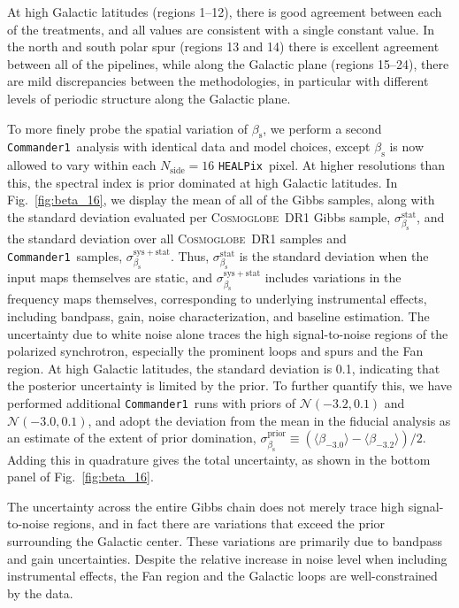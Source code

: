 \documentclass[twocolumn]{../../common/aa}
\def\healpix{\texttt{HEALPix}}
\def\commanderone{\texttt{Commander1}}
\newcommand{\cosmoglobe}{\textsc{Cosmoglobe}}
\begin{document}
At high Galactic latitudes (regions 1--12), there is good agreement between each of the treatments, and all values are consistent with a single constant value. 
In the north and south polar spur (regions 13 and 14) there is excellent agreement between all of the pipelines, while along the Galactic plane (regions 15--24), there are mild discrepancies between the methodologies, in particular with different levels of periodic structure along the Galactic plane.

To more finely probe the spatial variation of $\beta_\mathrm s$, we perform a second \commanderone\ analysis with identical data and model choices, except $\beta_\mathrm s$ is now allowed to vary within each $N_\mathrm{side}=16$ \healpix\ pixel. At higher resolutions than this, the spectral index is prior dominated at high Galactic latitudes. In Fig.~\ref{fig:beta_16}, we display the mean of all of the Gibbs samples, along with the standard deviation evaluated per \cosmoglobe\ DR1 Gibbs sample, $\sigma_{\beta_\mathrm s}^\mathrm{stat}$, and the standard deviation over all \cosmoglobe\ DR1 samples and \commanderone\ samples, $\sigma_{\beta_\mathrm s}^\mathrm{sys+stat}$. Thus, $\sigma_{\beta_\mathrm s}^\mathrm{stat}$ is the standard deviation when the input maps themselves are static, and $\sigma_{\beta_\mathrm s}^\mathrm{sys+stat}$ includes variations in the frequency maps themselves, corresponding to underlying instrumental effects, including bandpass, gain, noise characterization, and baseline estimation. The uncertainty due to white noise alone traces the high signal-to-noise regions of the polarized synchrotron, especially the prominent loops and spurs and the Fan region. At high Galactic latitudes, the standard deviation is 0.1, indicating that the posterior uncertainty is limited by the prior. To further quantify this, we have performed additional \commanderone\ runs with priors of $\mathcal N(-3.2,0.1)$ and $\mathcal N(-3.0,0.1)$, and adopt the deviation from the mean in the fiducial analysis as an estimate of the extent of prior domination, $\sigma_{\beta_\mathrm s}^\mathrm{prior}\equiv (\langle \beta_{-3.0}\rangle-\langle\beta_{-3.2}\rangle)/2$. Adding this in quadrature gives the total uncertainty, as shown in the bottom panel of Fig.~\ref{fig:beta_16}.

The uncertainty across the entire Gibbs chain does not merely trace high signal-to-noise regions, and in fact there are variations that exceed the prior surrounding the Galactic center. These variations are primarily due to bandpass and gain uncertainties. Despite the relative increase in noise level when including instrumental effects, the Fan region and the Galactic loops are well-constrained by the data.
\end{document}
